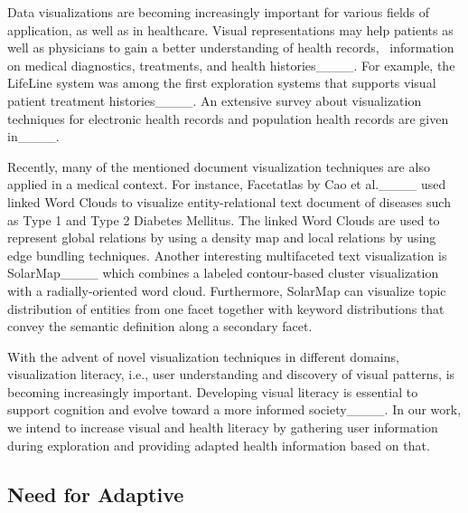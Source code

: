 Data visualizations are becoming increasingly important for various fields of application, as well as in healthcare. 
%
Visual representations may help patients as well as physicians to gain a better understanding of health records, \eg\ information on medical diagnostics, treatments, and health histories____. 
%
For example, the LifeLine system was among the first exploration systems that supports visual patient treatment histories____. 
%
An extensive survey about visualization techniques for electronic health records and population health records are given in____.


Recently, many of the mentioned document visualization techniques are also applied in a medical context. 
%
For instance, Facetatlas by Cao et al.____ used linked Word Clouds to visualize entity-relational text document of diseases such as Type 1 and Type 2 Diabetes
Mellitus. 
%
The linked Word Clouds are used to represent global relations by using a density map and local relations by using edge bundling techniques. 
%
Another interesting multifaceted text visualization is SolarMap____ which combines a labeled contour-based cluster visualization with a radially-oriented word cloud.
%
Furthermore, SolarMap can visualize topic distribution of entities from one facet together with keyword distributions that convey the semantic definition along a secondary facet.


With the advent of novel visualization techniques in different domains, visualization literacy, i.e., user understanding and discovery of visual patterns, is becoming increasingly important. 
%
Developing visual literacy is essential to support cognition and evolve toward a more informed society____. 
%
In our work, we intend to increase visual and health literacy by gathering user information during exploration and providing adapted health information based on that.



\subsection{Need for Adaptive \chis} \label{subsec:chis}

